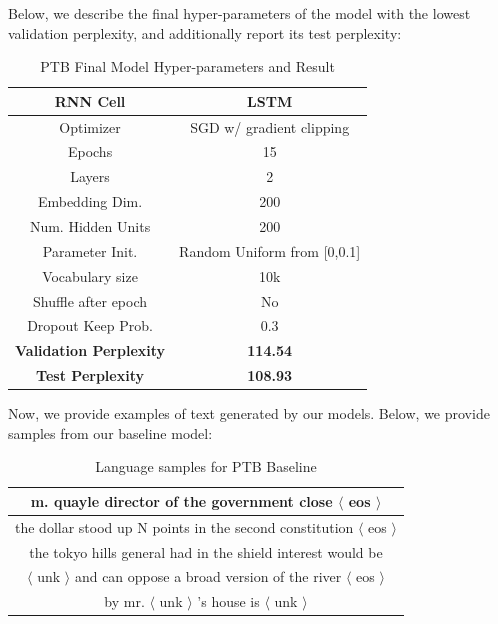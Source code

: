 \documentclass[a4paper]{article}
\begin{document}
Below, we describe the final hyper-parameters of the model with the lowest validation perplexity, and additionally report its test perplexity:
\begin{table}[H]
\centering
\begin{tabular}{|c | c|} 
 \hline
RNN Cell & LSTM\\ \hline
Optimizer & SGD w/ gradient clipping \\ \hline
Epochs & 15\\ \hline
Layers & 2\\ \hline
Embedding Dim. & 200\\ \hline
Num. Hidden Units & 200\\ \hline
Parameter Init. & Random Uniform from [0,0.1]\\ \hline
Vocabulary size & 10k\\ \hline
Shuffle after epoch & No \\ \hline
Dropout Keep Prob. & 0.3 \\ \hline
\textbf{Validation Perplexity} &\textbf{114.54} \\ \hline
\textbf{Test Perplexity} &\textbf{108.93} \\ \hline
\end{tabular}
\caption{PTB Final Model Hyper-parameters and Result}
\label{table:1}
\end{table}

Now, we provide examples of text generated by our models. Below, we provide samples from our baseline model:
\begin{table}[h]
\centering
\begin{tabular}{|c|} \hline
m. quayle director of the government close $\langle$ eos $\rangle$ \\ \hline
the dollar stood up N points in the second constitution $\langle$ eos $\rangle$ \\ \hline 
the tokyo hills general had in the shield interest would be \\ $\langle$ unk $\rangle$ and can oppose a broad version of the river $\langle$ eos $\rangle$ \\ \hline
by mr. $\langle$ unk $\rangle$ 's house is $\langle$ unk $\rangle$  \\ \hline
\end{tabular}
\caption{Language samples for PTB Baseline}
\label{table:1}
\end{table}
\end{document}

